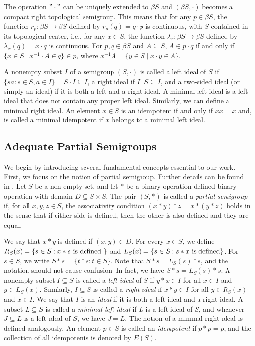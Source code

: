 \documentclass{amsart}
\theoremstyle{definition}
\theoremstyle{remark}
\numberwithin{equation}{section}
\begin{document}
The operation \("\cdot"\) can be uniquely extended to \(\beta S\) and \((\beta S, \cdot)\) becomes a compact right topological semigroup. This means that for any \(p \in \beta S\), the function \(r_p \colon \beta S \to \beta S\) defined by \(r_p(q) = q \cdot p\) is continuous, with \(S\) contained in its topological center, i.e., for any \(x \in S\), the function \(\lambda_x \colon \beta S \to \beta S\) defined by \(\lambda_x(q) = x \cdot q\) is continuous. For \(p, q \in \beta S\) and \(A \subseteq S\), \(A \in p \cdot q\) if and only if $\{x \in S \mid x^{-1} \cdot A \in q\} \in p$,  where \(x^{-1}  A = \{y \in S \mid x \cdot y \in A\}\).

A nonempty subset \(I\) of a semigroup \((S, \cdot)\) is called a {left ideal} of \(S\) if \(\{sa:s\in S,a\in I\}=S \cdot I \subseteq I\), a {right ideal} if \(I \cdot S \subseteq I\), and a {two-sided ideal} (or simply an {ideal}) if it is both a left and a right ideal. A {minimal left ideal} is a left ideal that does not contain any proper left ideal. Similarly, we can define a {minimal right ideal}. An element $x\in S$ is an idempotent if and only if $ xx = x$ and, is called a minimal idempotent if $x$ belongs to a minimal left ideal.

\subsection{Adequate Partial Semigroups} 

We begin by introducing several fundamental concepts essential to our work. First, we focus on the notion of partial semigroup. Further details can be found in \cite{Hindman,McCutcheon}.  Let $S$ be a non-empty set, and let $*$ be a binary operation defined binary operation with domain $ D \subseteq S \times S $. The pair \((S, *)\) is called a \emph{partial semigroup} if, for all $ x, y, z \in S $, the associativity condition $(x * y)* z = x * (y * z)$ holds in the sense that if either side is defined, then the other is also defined and they are equal.

We say that $ x* y$ is defined if \( (x, y) \in D \). For every \( x \in S \), we define $R_S(x) = \{s \in S : x * s \hbox{ is defined }\}$  
and $L_S(x) = \{s \in S : s * x \hbox{ is defined}\}$. 
For \( s \in S \), we write \( S * s = \{t * s : t \in S\} \). Note that $S * s = L_S(s) * s $, and the notation should not cause confusion. In fact, we have $S* s=L_S(s)* s$. A nonempty subset \( I \subseteq S \) is called a \emph{left ideal} of $ S $ if $ y * x \in I $ for all $ x \in I $ and $ y \in L_S(x) $. Similarly, $ I \subseteq S $ is called a \emph{right ideal} if $ x * y \in I $ for all $ y \in R_S(x) $ and $ x \in I $. We say that $ I $ is an \emph{ideal} if it is both a left ideal and a right ideal. A subset $ L \subseteq S $ is called a \emph{minimal left ideal} if $ L $ is a left ideal of $ S $, and whenever $ J\subseteq L $ is a left ideal of $ S $,  we have $ J = L $. The notion of a minimal right ideal is defined analogously. An element $ p \in S $ is called an \emph{idempotent} if $ p * p = p $, and the collection of all idempotents is denoted by $ E(S) $.
\end{document}
